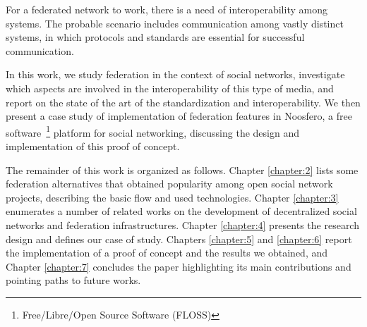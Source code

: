 For a federated network to work, there is a need of interoperability
among systems. The probable scenario includes communication among
vastly distinct systems, in which protocols and standards are essential
for successful communication.

In this work, we study federation in the context of social networks,
investigate which aspects are involved in the interoperability of this type of
media, and report on the state of the art of the standardization and
interoperability. We then present a case study of implementation of federation
features in Noosfero, a free software~\footnote{Free/Libre/Open Source Software
(FLOSS)} platform for social networking, discussing the design and
implementation of this proof of concept.

The remainder of this work is organized as follows. Chapter \ref{chapter:2} lists
some federation alternatives that obtained popularity among open social network
projects, describing the basic flow and used technologies. Chapter \ref{chapter:3}
enumerates a number of related works on the development of decentralized social
networks and federation infrastructures. Chapter \ref{chapter:4} presents the
research design and defines our case of study. Chapters \ref{chapter:5} and
\ref{chapter:6} report the implementation of a proof of concept and the results we
obtained, and Chapter \ref{chapter:7} concludes the paper highlighting its main
contributions and pointing paths to future works.
